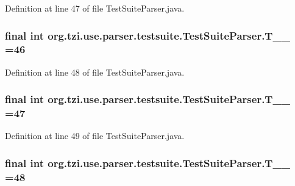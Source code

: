 Definition at line 47 of file Test\-Suite\-Parser.\-java.

\hypertarget{classorg_1_1tzi_1_1use_1_1parser_1_1testsuite_1_1_test_suite_parser_a6fb7f06426ecf2205e40e842a1a3cb08}{
\subsubsection[{T\-\_\-\-\_\-46}]{\setlength{\rightskip}{0pt plus 5cm}final int org.\-tzi.\-use.\-parser.\-testsuite.\-Test\-Suite\-Parser.\-T\-\_\-\-\_ =46\hspace{0.3cm}{\ttfamily [static]}}}\label{classorg_1_1tzi_1_1use_1_1parser_1_1testsuite_1_1_test_suite_parser_a6fb7f06426ecf2205e40e842a1a3cb08}


Definition at line 48 of file Test\-Suite\-Parser.\-java.

\hypertarget{classorg_1_1tzi_1_1use_1_1parser_1_1testsuite_1_1_test_suite_parser_ab83b77dcf05eb35842d0f34f1055af47}{
\subsubsection[{T\-\_\-\-\_\-47}]{\setlength{\rightskip}{0pt plus 5cm}final int org.\-tzi.\-use.\-parser.\-testsuite.\-Test\-Suite\-Parser.\-T\-\_\-\-\_ =47\hspace{0.3cm}{\ttfamily [static]}}}\label{classorg_1_1tzi_1_1use_1_1parser_1_1testsuite_1_1_test_suite_parser_ab83b77dcf05eb35842d0f34f1055af47}


Definition at line 49 of file Test\-Suite\-Parser.\-java.

\hypertarget{classorg_1_1tzi_1_1use_1_1parser_1_1testsuite_1_1_test_suite_parser_aed5433e3db2e62ad12a7c6c7d41721ed}{
\subsubsection[{T\-\_\-\-\_\-48}]{\setlength{\rightskip}{0pt plus 5cm}final int org.\-tzi.\-use.\-parser.\-testsuite.\-Test\-Suite\-Parser.\-T\-\_\-\-\_ =48\hspace{0.3cm}{\ttfamily [static]}}}\label{classorg_1_1tzi_1_1use_1_1parser_1_1testsuite_1_1_test_suite_parser_aed5433e3db2e62ad12a7c6c7d41721ed}


